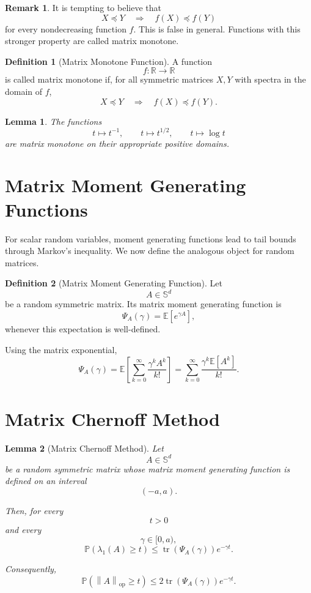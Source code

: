 \documentclass[12pt,oneside]{book}
\numberwithin{equation}{section}
\theoremstyle{definition}
\newtheorem{definition}{Definition}[section]
\newtheorem{remark}{Remark}[section]
\theoremstyle{plain}
\newtheorem{lemma}{Lemma}[section]
\theoremstyle{remark}
\newcommand{\R}{\mathbb{R}}
\newcommand{\E}{\mathbb{E}}
\newcommand{\Prob}{\mathbb{P}}
\newcommand{\norm}[1]{\left\lVert #1 \right\rVert}
\newcommand{\tr}{\operatorname{tr}}
\begin{document}
\begin{remark}
It is tempting to believe that
\[
X\preceq Y
\quad\Rightarrow\quad
f(X)\preceq f(Y)
\]
for every nondecreasing function $f$. This is false in general. Functions with this stronger property are called matrix monotone.
\end{remark}

\begin{definition}[Matrix Monotone Function]
A function
\[
f:\R\to\R
\]
is called matrix monotone if, for all symmetric matrices $X,Y$ with spectra in the domain of $f$,
\[
X\preceq Y
\quad\Rightarrow\quad
f(X)\preceq f(Y).
\]
\end{definition}

\begin{lemma}
The functions
\[
t\mapsto t^{-1},
\qquad
t\mapsto t^{1/2},
\qquad
t\mapsto \log t
\]
are matrix monotone on their appropriate positive domains.
\end{lemma}

\section{Matrix Moment Generating Functions}

For scalar random variables, moment generating functions lead to tail bounds through Markov's inequality. We now define the analogous object for random matrices.

\begin{definition}[Matrix Moment Generating Function]
Let
\[
A\in\mathbb{S}^d
\]
be a random symmetric matrix. Its matrix moment generating function is
\[
\Psi_A(\gamma)
=
\E[e^{\gamma A}],
\]
whenever this expectation is well-defined.
\end{definition}

Using the matrix exponential,
\[
\Psi_A(\gamma)
=
\E\left[
\sum_{k=0}^{\infty}\frac{\gamma^k A^k}{k!}
\right]
=
\sum_{k=0}^{\infty}\frac{\gamma^k\E[A^k]}{k!}.
\]

\section{Matrix Chernoff Method}

\begin{lemma}[Matrix Chernoff Method]
Let
\[
A\in\mathbb{S}^d
\]
be a random symmetric matrix whose matrix moment generating function is defined on an interval
\[
(-a,a).
\]

Then, for every
\[
t>0
\]
and every
\[
\gamma\in[0,a),
\]
\[
\Prob(\lambda_1(A)\geq t)
\leq
\tr(\Psi_A(\gamma))e^{-\gamma t}.
\]

Consequently,
\[
\Prob(\norm{A}_{\mathrm{op}}\geq t)
\leq
2\tr(\Psi_A(\gamma))e^{-\gamma t}.
\]
\end{lemma}
\end{document}
